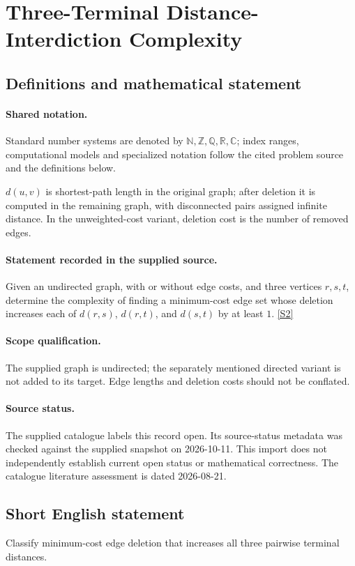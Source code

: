 \documentclass[11pt]{article}
\newcommand{\sref}[2]{\hyperlink{source:#1:#2}{[S#2]}}
\begin{document}
\section{Three-Terminal Distance-Interdiction Complexity}\label{statement}

\subsection{Definitions and mathematical statement}

\paragraph{Shared notation.}Standard number systems are denoted by $\mathbb N,\mathbb Z,\mathbb Q,\mathbb R,\mathbb C$; index ranges, computational models and specialized notation follow the cited problem source and the definitions below.


$d(u,v)$ is shortest-path length in the original graph; after deletion it is computed in the remaining graph, with disconnected pairs assigned infinite distance. In the unweighted-cost variant, deletion cost is the number of removed edges.
\paragraph{Statement recorded in the supplied source.}
Given an undirected graph, with or without edge costs, and three vertices $r,s,t$, determine the complexity of finding a minimum-cost edge set whose deletion increases each of $d(r,s)$, $d(r,t)$, and $d(s,t)$ by at least $1$. \sref{statement}{2}
\paragraph{Scope qualification.}
The supplied graph is undirected; the separately mentioned directed variant is not added to its target. Edge lengths and deletion costs should not be conflated.
\paragraph{Source status.}
The supplied catalogue labels this record open. Its source-status metadata was checked against the supplied snapshot on 2026-10-11. This import does not independently establish current open status or mathematical correctness. The catalogue literature assessment is dated 2026-08-21.
\subsection{Short English statement}
Classify minimum-cost edge deletion that increases all three pairwise terminal distances.
\end{document}
